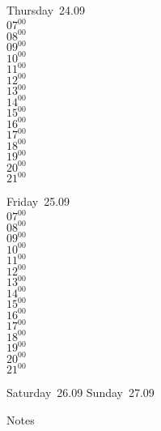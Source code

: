 \documentclass[11pt,a4paper]{book}\usepackage[]{graphicx}\usepackage[]{color}
\begin{document}
\clearpage
\begin{headerbox}
\end{headerbox}
\begin{weekdaybox}
  Thursday~24.09\\
  { 
  \vfill
  $07^{00}$\\
$08^{00}$\\
$09^{00}$\\
$10^{00}$\\
$11^{00}$\\
$12^{00}$\\
$13^{00}$\\
$14^{00}$\\
$15^{00}$\\
$16^{00}$\\
$17^{00}$\\
$18^{00}$\\
$19^{00}$\\
$20^{00}$\\
$21^{00}$\\
  }
\end{weekdaybox} 
\begin{weekdaybox}
  Friday~25.09\\
  { 
  \vfill
  $07^{00}$\\
$08^{00}$\\
$09^{00}$\\
$10^{00}$\\
$11^{00}$\\
$12^{00}$\\
$13^{00}$\\
$14^{00}$\\
$15^{00}$\\
$16^{00}$\\
$17^{00}$\\
$18^{00}$\\
$19^{00}$\\
$20^{00}$\\
$21^{00}$\\
  }
\end{weekdaybox}
\begin{weekendbox}
  Saturday~26.09
  \tcblower
  Sunday~27.09
\end{weekendbox} %
\begin{notebox}
  Notes
\end{notebox}
\clearpage
\end{document}
